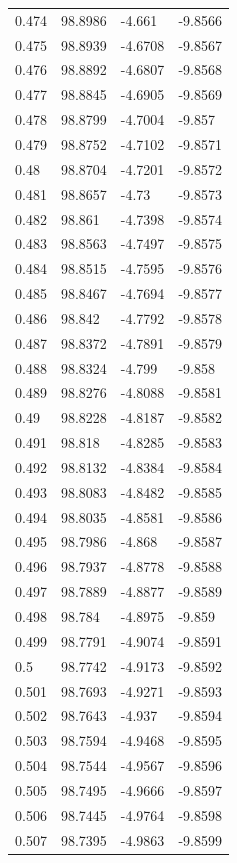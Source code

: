 \begin{tabular}{llll}
0.474 & 98.8986 & -4.661 & -9.8566 \\
0.475 & 98.8939 & -4.6708 & -9.8567 \\
0.476 & 98.8892 & -4.6807 & -9.8568 \\
0.477 & 98.8845 & -4.6905 & -9.8569 \\
0.478 & 98.8799 & -4.7004 & -9.857 \\
0.479 & 98.8752 & -4.7102 & -9.8571 \\
0.48 & 98.8704 & -4.7201 & -9.8572 \\
0.481 & 98.8657 & -4.73 & -9.8573 \\
0.482 & 98.861 & -4.7398 & -9.8574 \\
0.483 & 98.8563 & -4.7497 & -9.8575 \\
0.484 & 98.8515 & -4.7595 & -9.8576 \\
0.485 & 98.8467 & -4.7694 & -9.8577 \\
0.486 & 98.842 & -4.7792 & -9.8578 \\
0.487 & 98.8372 & -4.7891 & -9.8579 \\
0.488 & 98.8324 & -4.799 & -9.858 \\
0.489 & 98.8276 & -4.8088 & -9.8581 \\
0.49 & 98.8228 & -4.8187 & -9.8582 \\
0.491 & 98.818 & -4.8285 & -9.8583 \\
0.492 & 98.8132 & -4.8384 & -9.8584 \\
0.493 & 98.8083 & -4.8482 & -9.8585 \\
0.494 & 98.8035 & -4.8581 & -9.8586 \\
0.495 & 98.7986 & -4.868 & -9.8587 \\
0.496 & 98.7937 & -4.8778 & -9.8588 \\
0.497 & 98.7889 & -4.8877 & -9.8589 \\
0.498 & 98.784 & -4.8975 & -9.859 \\
0.499 & 98.7791 & -4.9074 & -9.8591 \\
0.5 & 98.7742 & -4.9173 & -9.8592 \\
0.501 & 98.7693 & -4.9271 & -9.8593 \\
0.502 & 98.7643 & -4.937 & -9.8594 \\
0.503 & 98.7594 & -4.9468 & -9.8595 \\
0.504 & 98.7544 & -4.9567 & -9.8596 \\
0.505 & 98.7495 & -4.9666 & -9.8597 \\
0.506 & 98.7445 & -4.9764 & -9.8598 \\
0.507 & 98.7395 & -4.9863 & -9.8599 \\

\end{tabular}

